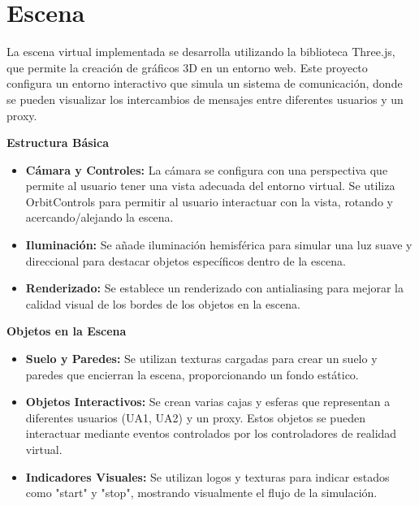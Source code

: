 \documentclass[a4paper, 12pt]{book}
\begin{document}
\section{Escena} 
\label{sec:escena}

La escena virtual implementada se desarrolla utilizando la biblioteca Three.js, 
que permite la creación de gráficos 3D en un entorno web. Este proyecto configura un entorno interactivo 
que simula un sistema de comunicación, donde se pueden visualizar los intercambios de mensajes entre diferentes usuarios y un proxy.

\textbf{Estructura Básica}

\begin{itemize}
  \item \textbf{Cámara y Controles:} La cámara se configura con una perspectiva que permite al usuario tener una vista adecuada del entorno virtual. 
  Se utiliza OrbitControls para permitir al usuario interactuar con la vista, rotando y acercando/alejando la escena.
  
  \item \textbf{Iluminación:} Se añade iluminación hemisférica para simular una luz suave y direccional 
  para destacar objetos específicos dentro de la escena.

  \item \textbf{Renderizado:} Se establece un renderizado con antialiasing para mejorar la calidad visual de los bordes de los objetos en la escena.
  
\end{itemize}

\textbf{Objetos en la Escena}

\begin{itemize}
  \item \textbf{Suelo y Paredes:} Se utilizan texturas cargadas para crear un suelo y paredes que encierran la escena, proporcionando un fondo estático.
  
  \item \textbf{Objetos Interactivos:} Se crean varias cajas y esferas que representan a diferentes usuarios (UA1, UA2) y un proxy. 
  Estos objetos se pueden interactuar mediante eventos controlados por los controladores de realidad virtual.

  \item \textbf{Indicadores Visuales:} Se utilizan logos y texturas para indicar estados como "start" y "stop", mostrando visualmente el flujo de la simulación.
  
\end{itemize}
\end{document}
